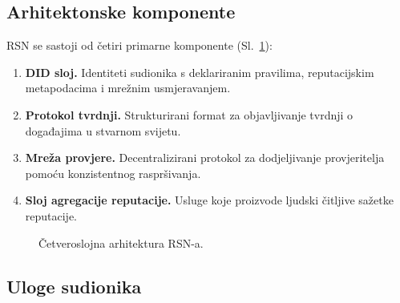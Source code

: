 \documentclass[11pt,a4paper,twocolumn]{article}
\begin{document}
\subsection{Arhitektonske komponente}

RSN se sastoji od četiri primarne komponente (Sl.~\ref{fig:architecture}):
\begin{enumerate}[nosep]
\item \textbf{DID sloj.} Identiteti sudionika s deklariranim pravilima, reputacijskim metapodacima i mrežnim usmjeravanjem.
\item \textbf{Protokol tvrdnji.} Strukturirani format za objavljivanje tvrdnji o događajima u stvarnom svijetu.
\item \textbf{Mreža provjere.} Decentralizirani protokol za dodjeljivanje provjeritelja pomoću konzistentnog raspršivanja.
\item \textbf{Sloj agregacije reputacije.} Usluge koje proizvode ljudski čitljive sažetke reputacije.
\end{enumerate}

\begin{figure}[ht]
\centering
{}
\caption{Četveroslojna arhitektura RSN-a.}
\label{fig:architecture}
\end{figure}

\subsection{Uloge sudionika}
\end{document}
